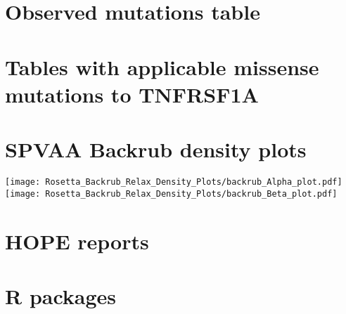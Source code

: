 \section*{Observed mutations table}


\newpage
\section*{Tables with applicable missense mutations to TNFRSF1A}


\newpage


\newpage

\section*{SPVAA Backrub density plots}
\texttt{[image: Rosetta\_Backrub\_Relax\_Density\_Plots/backrub\_Alpha\_plot.pdf]}
\newpage
\texttt{[image: Rosetta\_Backrub\_Relax\_Density\_Plots/backrub\_Beta\_plot.pdf]}

\section*{HOPE reports}



\newpage
\section*{R packages}
